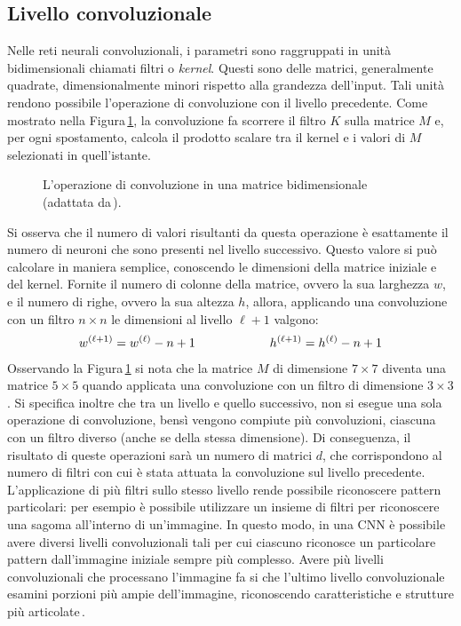 \subsection{Livello convoluzionale}
% 
Nelle reti neurali convoluzionali, i parametri sono raggruppati in unità bidimensionali chiamati filtri o \textit{kernel}. Questi sono delle matrici, generalmente quadrate, dimensionalmente minori rispetto alla grandezza dell'input. Tali unità rendono possibile l'operazione di convoluzione con il livello precedente. Come mostrato nella Figura\,\ref{fig:convolution-operation}, la convoluzione fa scorrere il filtro $K$ sulla matrice $M$ e, per ogni spostamento, calcola il prodotto scalare tra il kernel e i valori di $M$ selezionati in quell'istante.
% 
\begin{figure}[!b]
    \centering
    
    \caption[L'operazione di convoluzione in una matrice bidimensionale.]{L'operazione di convoluzione in una matrice bidimensionale (adattata da\,\cite{janosh_convolution}).}\label{fig:convolution-operation}
\end{figure}
% 
Si osserva che il numero di valori risultanti da questa operazione è esattamente il numero di neuroni che sono presenti nel livello successivo. Questo valore si può calcolare in maniera semplice, conoscendo le dimensioni della matrice iniziale e del kernel. Fornite il numero di colonne della matrice, ovvero la sua larghezza $w$, e il numero di righe, ovvero la sua altezza $h$, allora, applicando una convoluzione con un filtro $n \times n$ le dimensioni al livello $\ell + 1$ valgono:
% 
\begin{gather*}
    w^{(\ell + 1)} = w^{(\ell)} - n + 1
    \hspace{60px}
    h^{(\ell + 1)} = h^{(\ell)} - n + 1
\end{gather*}
% 
Osservando la Figura\,\ref{fig:convolution-operation} si nota che la matrice $M$ di dimensione $7\times 7$ diventa una matrice $5 \times 5$ quando applicata una convoluzione con un filtro di dimensione $3\times 3$. Si specifica inoltre che tra un livello e quello successivo, non si esegue una sola operazione di convoluzione, bensì vengono compiute più convoluzioni, ciascuna con un filtro diverso (anche se della stessa dimensione). Di conseguenza, il risultato di queste operazioni sarà un numero di matrici $d$, che corrispondono al numero di filtri con cui è stata attuata la convoluzione sul livello precedente. L'applicazione di più filtri sullo stesso livello rende possibile riconoscere pattern particolari: per esempio è possibile utilizzare un insieme di filtri per riconoscere una sagoma all'interno di un'immagine. In questo modo, in una \acs{CNN} è possibile avere diversi livelli convoluzionali tali per cui ciascuno riconosce un particolare pattern dall'immagine iniziale sempre più complesso. Avere più livelli convoluzionali che processano l'immagine fa si che l'ultimo livello convoluzionale esamini porzioni più ampie dell'immagine, riconoscendo caratteristiche e strutture più articolate\,\cite{aggarwal2018neural, wu2017introduction}.
